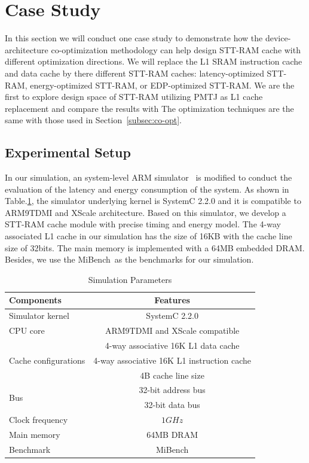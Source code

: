 \section{Case Study} \label{sec:case}
In this section we will conduct one case study to demonstrate how the device-architecture co-optimization methodology can help design STT-RAM cache with different optimization directions. We will replace the L1 SRAM instruction cache and data cache by there different STT-RAM caches: latency-optimized STT-RAM, energy-optimized STT-RAM, or EDP-optimized STT-RAM. We are the first to explore design space of STT-RAM utilizing PMTJ as L1 cache replacement and compare the results with The optimization techniques are the same with those used in Section~\ref{subsec:co-opt}.

\subsection{Experimental Setup}
In our simulation, an system-level ARM simulator~\cite{FaCSim} is modified to conduct the evaluation of the latency and energy consumption of the system. As shown in Table.\ref{tb:parameters}, the simulator underlying kernel is SystemC 2.2.0 and it is compatible to ARM9TDMI and XScale architecture. Based on this simulator, we develop a STT-RAM cache module with precise timing and energy model. The 4-way associated  L1 cache in our simulation has the size of 16KB with the cache line size of 32bits. The main memory is implemented with a 64MB embedded DRAM. Besides, we use the MiBench~\cite{MiBench}as the benchmarks for our simulation.

\begin{table}[t]
\centering
\caption{Simulation Parameters}
\label{tb:parameters}
\vspace{-5pt}
\begin{tabular}{ l | c }
\hline \hline
Components & Features\\
\hline
Simulator kernel & SystemC 2.2.0\\
\hline
CPU core & ARM9TDMI and XScale compatible \\
\hline
\multirow{3}{*}{Cache configurations} & 4-way associative 16K L1 data cache \\
& 4-way associative 16K L1 instruction cache \\
& 4B cache line size \\
\hline
\multirow{2}{*}{Bus} & 32-bit address bus  \\
& 32-bit data bus \\
\hline
Clock frequency & $1GHz$ \\
\hline
Main memory & 64MB DRAM \\
\hline
Benchmark & MiBench \\
\hline\hline
\end{tabular}
\vspace{-10pt}
\end{table}


